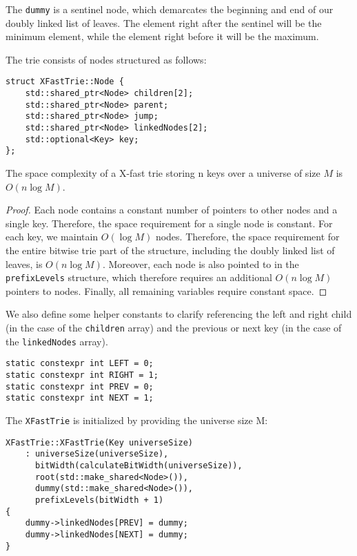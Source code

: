 The \texttt{dummy} is a sentinel node, which demarcates the beginning and end of our doubly linked list of leaves. The element right after the sentinel will be the minimum element, while the element right before it will be the maximum.

The trie consists of nodes structured as follows:

\begin{verbatim}
struct XFastTrie::Node {
    std::shared_ptr<Node> children[2];
    std::shared_ptr<Node> parent;
    std::shared_ptr<Node> jump;
    std::shared_ptr<Node> linkedNodes[2];
    std::optional<Key> key;
};
\end{verbatim}

\begin{lemma}
The space complexity of a X-fast trie storing n keys over a universe of size \( M \) is \( O(n \log M) \).
\end{lemma}

\begin{proof}
Each node contains a constant number of pointers to other nodes and a single key. Therefore, the space requirement for a single node is constant. For each key, we maintain \( O(\log M) \) nodes. Therefore, the space requirement for the entire bitwise trie part of the structure, including the doubly linked list of leaves, is \( O(n \log M) \).
Moreover, each node is also pointed to in the \texttt{prefixLevels} structure, which therefore requires an additional \( O(n \log M) \) pointers to nodes.  
Finally, all remaining variables require constant space.
\end{proof}

We also define some helper constants to clarify referencing the left and right child (in the case of the \texttt{children} array) and the previous or next key (in the case of the \texttt{linkedNodes} array).

\begin{verbatim}
static constexpr int LEFT = 0;
static constexpr int RIGHT = 1;
static constexpr int PREV = 0;
static constexpr int NEXT = 1;
\end{verbatim}

The \texttt{XFastTrie} is initialized by providing the universe size M:

\begin{verbatim}
XFastTrie::XFastTrie(Key universeSize)
    : universeSize(universeSize),
      bitWidth(calculateBitWidth(universeSize)),
      root(std::make_shared<Node>()),
      dummy(std::make_shared<Node>()),
      prefixLevels(bitWidth + 1)
{
    dummy->linkedNodes[PREV] = dummy;
    dummy->linkedNodes[NEXT] = dummy;
}
\end{verbatim}



